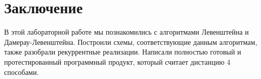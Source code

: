 \documentclass[12pt]{report}
\begin{document}
	
	









%

\chapter*{Заключение}
В этой лабораторной работе мы познакомились с алгоритмами Левенштейна и Дамерау-Левенштейна. Построили схемы, соответствующие данным алгоритмам, также разобрали рекуррентные реализации. Написали полностью готовый и протестированный программный продукт, который считает дистанцию 4 способами. 
\end{document}
